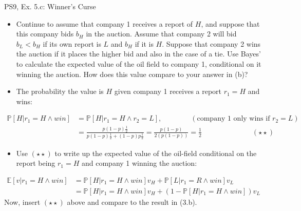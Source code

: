 \begin{frame}{PS9, Ex. 5.c: Winner's Curse}
      \begin{itemize}
        \item[(c)] Continue to assume that company 1 receives a report of $H$, and suppose that this company bids $b_H$ in the auction. Assume that company 2 will bid $b_L < b_H$ if its own report is $L$ and $b_H$ if it is $H$. Suppose that company 2 wins the auction if it places the higher bid and also in the case of a tie. Use Bayes’ to calculate the expected value of the oil field to company 1, conditional on it winning the auction. How does this value compare to your answer in (b)?
        \item[Step 1:] The probability the value is $H$ given company 1 receives a report $r_1=H$ and wins:
        \end{itemize}
        \vspace{-8pt}
        \begin{align*}
          \mathbb{P}[H|r_1=H\wedge win]&=\mathbb{P}[H|r_1=H\wedge r_2=L],\quad\quad\quad\quad(\text{company 1 only wins if }r_2=L)\\
            &=\frac{p(1-p)\frac{1}{2}}{p(1-p)\frac{1}{2}+(1-p)p\frac{1}{2}}=\frac{p(1-p)}{2(p(1-p))}=\frac{1}{2}\quad\quad\quad\quad\quad\quad\quad(\star\star)
        \end{align*}
        \vspace{-8pt}
        \begin{itemize}
        \item[Step 2:] Use $(\star\star)$ to write up the expected value of the oil-field conditional on the report being $r_1=H$ and company 1 winning the auction:
      \end{itemize}
      \vspace{-4pt}
      \begin{align*}
        \mathbb{E}[v|r_1=H\wedge win]&=\mathbb{P}[H|r_1=H\wedge win]v_H+\mathbb{P}[L|r_1=R\wedge win]v_L\\
        &=\mathbb{P}[H|r_1=H\wedge win]v_H+\left(1-\mathbb{P}[H|r_1=H\wedge win]\right)v_L
      \end{align*}
      Now, insert $(\star\star)$ above and compare to the result in (3.b).
      \vfill\null
\end{frame}
